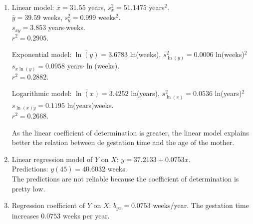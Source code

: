 \documentclass[
  a4paper,
]{scrreport}
\theoremstyle{definition}
\theoremstyle{remark}
\begin{document}
\begin{tcolorbox}[enhanced jigsaw, left=2mm, leftrule=.75mm, opacitybacktitle=0.6, colframe=quarto-callout-tip-color-frame, title=\textcolor{quarto-callout-tip-color}{\faLightbulb}\hspace{0.5em}{Solution}, opacityback=0, breakable, bottomtitle=1mm, titlerule=0mm, colback=white, toptitle=1mm, coltitle=black, bottomrule=.15mm, toprule=.15mm, arc=.35mm, rightrule=.15mm, colbacktitle=quarto-callout-tip-color!10!white]

\begin{enumerate}
\def\labelenumi{\alph{enumi}.}
\item
  Linear model: \(\overline{x}=31.55\) years, \(s_x^2=51.1475\)
  years\(^2\).\\
  \(\bar y=39.59\) weeks, \(s_y^2=0.999\) weeks\(^2\).\\
  \(s_{xy}=3.853\) years\(\cdot\)weeks.\\
  \(r^2 = 0.2905\).

  Exponential model: \(\overline{\ln(y)} = 3.6783\) ln(weeks),
  \(s_{\ln(y)}^2 = 0.0006\) ln(weeks)\(^2\)\\
  \(s_{x\ln(y)} = 0.0958\) years\(\cdot\ln\)(weeks).\\
  \(r^2 = 0.2882\).

  Logarithmic model: \(\overline{\ln(x)} = 3.4252\) ln(years),
  \(s_{\ln(x)}^2 = 0.0536\) ln(years)\(^2\)\\
  \(s_{\ln(x)y} = 0.1195\) ln(years)weeks.\\
  \(r^2 = 0.2668\).

  As the linear coefficient of determination is greater, the linear
  model explains better the relation between de gestation time and the
  age of the mother.
\item
  Linear regression model of \(Y\) on \(X\):
  \(y = 37.2133 + 0.0753 x\).\\
  Predictions: \(y(45) = 40.6032\) weeks.\\
  The predictions are not reliable because the coefficient of
  determination is pretty low.
\item
  Regression coefficient of \(Y\) on \(X\): \(b_{yx} = 0.0753\)
  weeks/year. The gestation time increases \(0.0753\) weeks per year.
\end{enumerate}

\end{tcolorbox}
\end{document}
